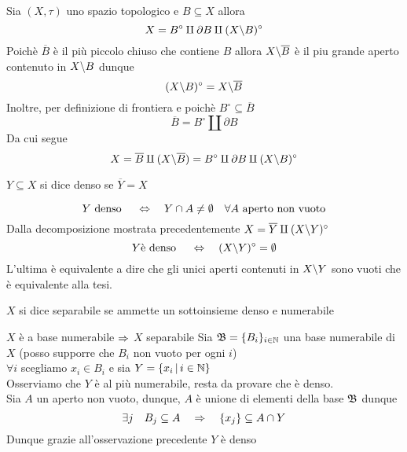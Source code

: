 \begin{prop}Sia $(X,\tau)$ uno spazio topologico e $B\subseteq X$ allora
$$ X = B^\circ \amalg \partial B \amalg (X\backslash B)^\circ$$
\proof Poich\`e $\overline{B}$ \`e il pi\`u piccolo chiuso che contiene $B$  allora $X\backslash \overline{B}$ \`e il piu grande aperto contenuto in $X\backslash B$ dunque 
$$ (X\backslash B)^\circ = X \backslash \overline{B}$$
Inoltre, per definizione di frontiera e poich\`e $B^\circ \subseteq \overline{B}$
$$\overline{B}=B^\circ \amalg \partial B $$
Da cui segue
$$ X=\overline{B} \amalg ( X\backslash \overline{B}) = B^\circ \amalg \partial B \amalg (X\backslash B)^\circ$$
\endproof
\end{prop}
\spazio
\begin{defn}$Y \subseteq X $ si dice denso se $\overline{Y}=X$
\end{defn}
\begin{oss}$$ Y \text{ denso } \quad \Leftrightarrow \quad Y \cap A \neq \emptyset \quad \forall A \text{ aperto non vuoto}$$
Dalla decomposizione mostrata precedentemente $ X =  \overline{Y} \amalg (X\backslash Y)^\circ$
$$ Y \text{\`e denso } \quad \Leftrightarrow \quad (X\backslash Y)^\circ = \emptyset$$ 
L'ultima \`e equivalente a dire che gli unici aperti contenuti in $X\backslash Y$ sono vuoti che \`e equivalente alla tesi.
\end{oss}
\spazio
\begin{defn}$X$ si dice separabile se ammette un sottoinsieme denso e numerabile
\end{defn}
\begin{prop} $X$ \`e a base numerabile $\Rightarrow$  $X$ separabile
\proof Sia $ \displaystyle \mathfrak{B}=\{ B_i \}_{i \in \mathbb{N}} $ una base numerabile di $X$ (posso supporre che  $B_i$ non vuoto per ogni $i$)\\
$\forall i $ scegliamo $x_i\in B_i$ e sia $Y=\{ x_i \, \vert \, i \in \mathbb{N}\}$\\
Osserviamo che $Y$ \`e al pi\`u numerabile, resta da provare che \`e denso.\\
Sia $A$ un aperto non vuoto, dunque, $A$ \`e unione di elementi della base $\mathfrak{B}$ dunque 
$$ \exists j \quad B_j \subseteq A \quad \Rightarrow \quad \{ x_j \} \subseteq A \cap Y $$ 
Dunque grazie all'osservazione precedente $Y$ \`e denso  
\endproof
\end{prop}
\spazio

